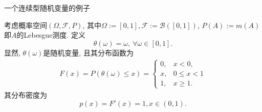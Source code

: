 

\begin{frame}{一个连续型随机变量的例子}
\begin{exam}
  考虑概率空间$(\Omega,\mathcal{F}, P)$, 其中$\Omega:=[0,1], \mathcal{F}:=\mathcal{B}([0,1])$, $P(A):=m(A)$即$A$的Lebesgue测度. 定义
  \[\theta(\omega)=\omega, \ \forall \omega\in [0,1].\]
  \pause 显然, $\theta(\omega)$是随机变量, 且其分布函数为\pause
  \begin{eqnarray*}
	F(x)=P(\theta(\omega)\leq x)=\left\{
		\begin{array}{ll}
		 0, & x<0,\\
		 x, & 0\leq x<1\\
		 1, & x\geq 1.
		\end{array}
		\right.
  \end{eqnarray*}
其分布密度为
\[p(x)=F'(x)=1, x\in (0,1).\]

\end{exam}


\end{frame}







